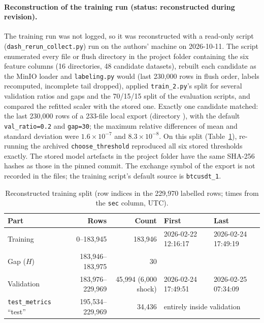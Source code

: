 \documentclass[10pt,a4paper]{article}
\begin{document}
\paragraph{Reconstruction of the training run (status: reconstructed during revision).} The training run was not logged, so it was reconstructed with a read-only script (\texttt{dash\_rerun\_collect.py}) run on the authors' machine on 2026-10-11. The script enumerated every file or flush directory in the project folder containing the six feature columns (16 directories, 48 candidate datasets), rebuilt each candidate as the MinIO loader and \texttt{labeling.py} would (last 230,000 rows in flush order, labels recomputed, incomplete tail dropped), applied \texttt{train\_2.py}'s split for several validation ratios and gaps and the 70/15/15 split of the evaluation scripts, and compared the refitted scaler with the stored one. Exactly one candidate matched: the last 230,000 rows of a 233-file local export (directory ), with the default \texttt{val\_ratio=0.2} and \texttt{gap=30}; the maximum relative differences of mean and standard deviation were $1.6\times10^{-7}$ and $8.3\times10^{-8}$. On this split (Table~\ref{tab:split}), re-running the archived \texttt{choose\_threshold} reproduced all six stored thresholds exactly. The stored model artefacts in the project folder have the same SHA-256 hashes as those in the pinned commit. The exchange symbol of the export is not recorded in the files; the training script's default source is \texttt{btcusdt\_1}.

\begin{table}[h]
\centering\small
\caption{Reconstructed training split (row indices in the 229,970 labelled rows; times from the \texttt{sec} column, UTC).}\label{tab:split}
\begin{tabular}{lrrll}
\toprule
Part & Rows & Count & First & Last \\
\midrule
Training & 0--183,945 & 183,946 & 2026-02-22 12:16:17 & 2026-02-24 17:49:19 \\
Gap ($H$) & 183,946--183,975 & 30 & & \\
Validation & 183,976--229,969 & 45,994 (6,000 shock) & 2026-02-24 17:49:51 & 2026-02-25 07:34:09 \\
\texttt{test\_metrics} ``test'' & 195,534--229,969 & 34,436 & \multicolumn{2}{l}{entirely inside validation} \\
\bottomrule
\end{tabular}
\end{table}
\end{document}
